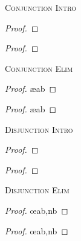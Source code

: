 \setlength{\columnsep}{2.25cm}
\begin{multicols}{2}

\noindent\textsc{Conjunction Intro}

\begin{proof}
	 
\end{proof}

\begin{proof}
	 
\end{proof}
\bigskip

\noindent\textsc{Conjunction Elim}

\begin{proof}
	 \ae{ab}
\end{proof}

\begin{proof}
	 \ae{ab}
\end{proof}
\bigskip



\vfill\null
\columnbreak

\noindent\textsc{Disjunction Intro}

\begin{proof}
	 
\end{proof}

\begin{proof}
	 
\end{proof}
\bigskip


\noindent\textsc{Disjunction Elim}

\begin{proof}
	 \oe{ab,nb}
\end{proof}

\begin{proof}
	 \oe{ab,nb}
\end{proof}
\bigskip



\end{multicols}
